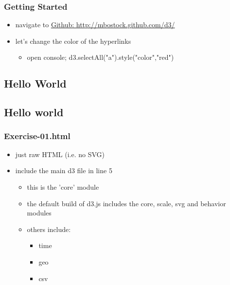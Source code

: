 \documentclass{beamer}
\begin{document}
\begin{frame}
    \frametitle{Getting Started}
    \begin{itemize}
    \item navigate to \href{http://mbostock.github.com/d3/}{\underline{Github}: http://mbostock.github.com/d3/}
    \item let's change the color of the hyperlinks
        \begin{itemize}
        \item open console; d3.selectAll("a").style("color","red")
        \end{itemize}
    \end{itemize}
\subsection{Hello World}



\subsection{Hello world}

\begin{frame}
    \frametitle{Exercise-01.html}
    \begin{itemize}
    \item just raw HTML (i.e. no SVG)
    \item include the main d3 file in line 5
        \begin{itemize}
        \item this is the 'core' module
        \item the default build of d3.js includes the core, scale, svg and behavior modules
        \item others include:
            \begin{itemize}
            \item time
            \item geo
            \item csv
            \end{itemize}
        \end{itemize}
    \end{itemize}
\end{frame}



\end{frame}
\end{document}
